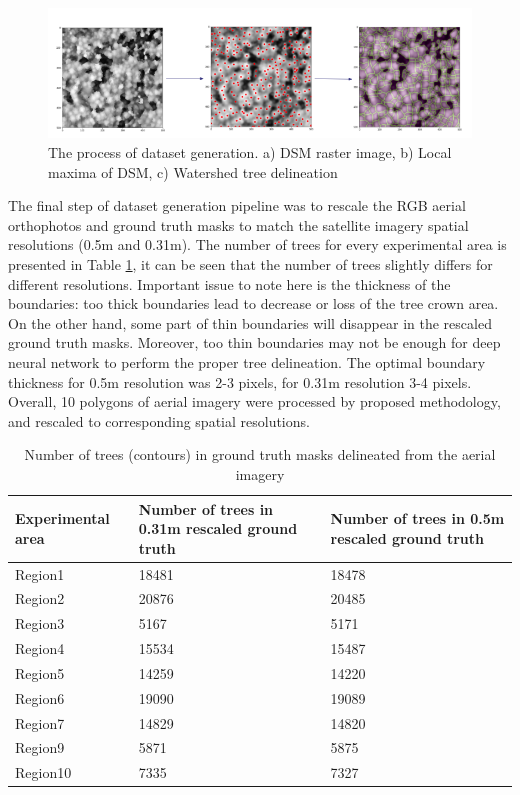 \begin{figure}[ht]
\centering
\includegraphics[scale=0.6]{images/DataGen.png}
\caption{The process of dataset generation. a) \gls{DSM}  raster image, b) Local maxima of \gls{DSM}, c) Watershed tree delineation} 
\label{DataGen}
\end{figure}

The final step of dataset generation pipeline was to rescale the RGB aerial orthophotos and ground truth masks to match the satellite imagery spatial resolutions (0.5m and 0.31m). The number of trees for every experimental area is presented in Table \ref{TreeN}, it can be seen that the number of trees slightly differs for different resolutions. Important issue to note here is the thickness of the boundaries: too thick boundaries lead to decrease or loss of the tree crown area. On the other hand, some part of thin boundaries will disappear in the rescaled ground truth masks.  Moreover, too thin boundaries may not be enough for deep neural network to perform the proper tree delineation. The optimal boundary thickness for 0.5m resolution was 2-3 pixels, for 0.31m resolution 3-4 pixels. Overall, 10 polygons of aerial imagery were processed by proposed methodology, and rescaled to corresponding spatial resolutions.


\begin{table}
\caption{Number of trees (contours) in ground truth masks delineated from the aerial imagery}
\label{TreeN}
\vskip 0.15in
\begin{center}
\begin{small}
\begin{sc}
\begin{tabular}{|l|p{4cm}|p{4cm}|}
\hline
\textbf{Experimental area} & \textbf{Number of trees in 0.31m rescaled ground truth} & \textbf{Number of trees in 0.5m rescaled ground truth}\\\hline
Region1 &18481  & 18478\\\hline
Region2 &20876  & 20485\\\hline
Region3 &5167  & 5171\\\hline
Region4 &15534  & 15487\\\hline
Region5 &14259  & 14220\\\hline
Region6 &19090  & 19089\\\hline
Region7 &14829  & 14820\\\hline
Region9 &5871  & 5875\\\hline
Region10 &7335  & 7327\\\hline
\end{tabular}
\end{sc}
\end{small}
\end{center}
\vskip -0.1in
\end{table}

